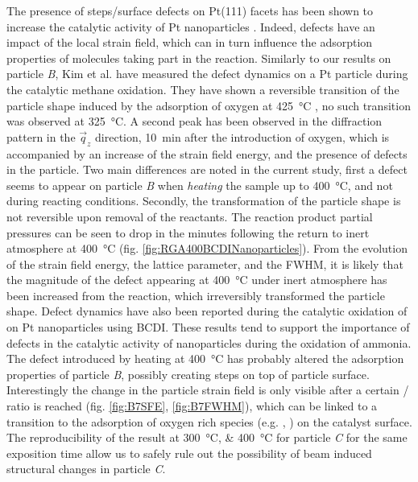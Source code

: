 The presence of steps/surface defects on Pt(111) facets has been shown to increase the catalytic activity of Pt nanoparticles \parencite{Segner1984, Chen2012}.
Indeed, defects have an impact of the local strain field, which can in turn influence the adsorption properties of molecules taking part in the reaction.
Similarly to our results on particle \textit{B}, Kim et al. \parencite*{Kim2019} have measured the defect dynamics on a Pt particle during the catalytic methane oxidation.
They have shown a reversible transition of the particle shape induced by the adsorption of oxygen at \qty{425}{\degreeCelsius}
, no such transition was observed at \qty{325}{\degreeCelsius}.
A second peak has been observed in the diffraction pattern in the $\vec{q}_z$ direction, \qty{10}{\minute} after the introduction of oxygen, which is accompanied by an increase of the strain field energy, and the presence of defects in the particle.
Two main differences are noted in the current study, first a defect seems to appear on particle \textit{B} when \textit{heating} the sample up to \qty{400}{\degreeCelsius}, and not during reacting conditions.
Secondly, the transformation of the particle shape is not reversible upon removal of the reactants.
The reaction product partial pressures can be seen to drop in the minutes following the return to inert atmosphere at \qty{400}{\degreeCelsius} (fig. \ref{fig:RGA400BCDINanoparticles}).
From the evolution of the strain field energy, the lattice parameter, and the FWHM, it is likely that the magnitude of the defect appearing at \qty{400}{\degreeCelsius} under inert atmosphere has been increased from the reaction, which irreversibly transformed the particle shape.
Defect dynamics have also been reported during the catalytic oxidation of  on Pt nanoparticles \parencite{Carnis2021b} using BCDI.
These results tend to support the importance of defects in the catalytic activity of nanoparticles during the oxidation of ammonia.
The defect introduced by heating at \qty{400}{\degreeCelsius} has probably altered the adsorption properties of particle \textit{B}, possibly creating steps on top of particle surface.
Interestingly the change in the particle strain field is only visible after a certain / ratio is reached (fig. \ref{fig:B7SFE}, \ref{fig:B7FWHM}), which can be linked to a transition to the adsorption of oxygen rich species (e.g. , ) on the catalyst surface.
The reproducibility of the result at \qtylist{300;400}{\degreeCelsius} for particle \textit{C} for the same exposition time allow us to safely rule out the possibility of beam induced structural changes in particle \textit{C}.

